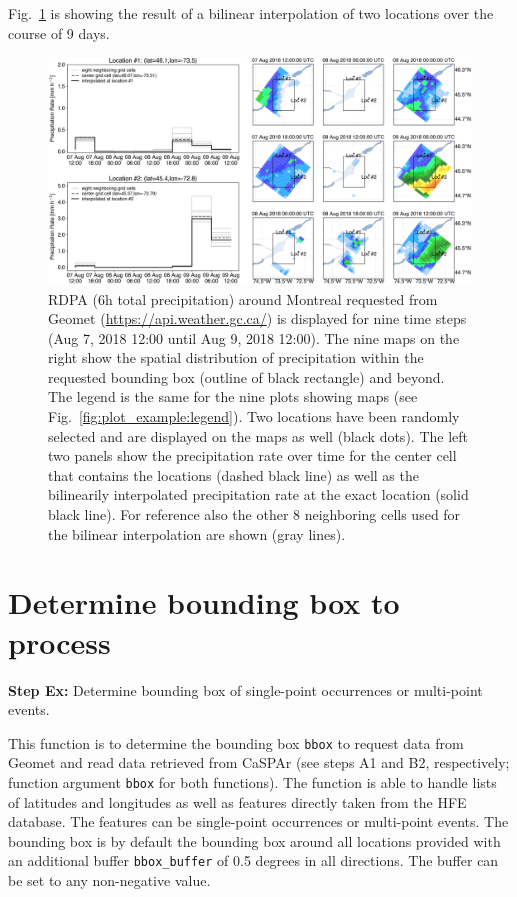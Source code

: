 \documentclass[10pt,a4paper,titlepage,parskip]{scrartcl}
\begin{document}
Fig.~\ref{fig:plot_example:bilinear} is showing the result of a bilinear interpolation of two locations over the course of 9 days.

\begin{figure}[h!]
	\centering
	\includegraphics[width=\linewidth]{figures/test-bilinear-interpolation.png}
	\caption{RDPA (6h total precipitation) around Montreal requested from Geomet (\url{https://api.weather.gc.ca/}) is displayed for nine time steps (Aug 7, 2018 12:00 until Aug 9, 2018 12:00). The nine maps on the right show the spatial distribution of precipitation within the requested bounding box (outline of black rectangle) and beyond. The legend is the same for the nine plots showing maps (see Fig.~\ref{fig:plot_example:legend}). Two locations have been randomly selected and are displayed on the maps as well (black dots). The left two panels show the precipitation rate over time for the center cell that contains the locations (dashed black line) as well as the bilinearily interpolated precipitation rate at the exact location (solid black line). For reference also the other 8 neighboring cells used for the bilinear interpolation are shown (gray lines).}
	\label{fig:plot_example:bilinear}
\end{figure}
\clearpage 

\section{Determine bounding box to process}

\textbf{Step Ex:} Determine bounding box of single-point occurrences or multi-point events.

This function is to determine the bounding box \texttt{bbox} to request data from Geomet and read data retrieved from CaSPAr (see steps A1 and B2, respectively; function argument \texttt{bbox} for both functions). The function is able to handle lists of latitudes and longitudes as well as features directly taken from the HFE database. The features can be single-point occurrences or multi-point events. The bounding box is by default the bounding box around all locations provided with an additional buffer \texttt{bbox\_buffer} of 0.5 degrees in all directions. The buffer can be set to any non-negative value.
\end{document}
